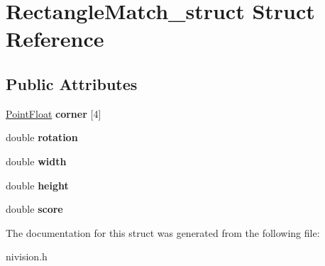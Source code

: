 \hypertarget{structRectangleMatch__struct}{
\section{RectangleMatch\_\-struct Struct Reference}
\label{structRectangleMatch__struct}
}
\subsection*{Public Attributes}
\begin{DoxyCompactItemize}
\item 
\hypertarget{structRectangleMatch__struct_a2660d504e9b45c3d09eda7be91780fc0}{
\hyperlink{structPointFloat__struct}{PointFloat} {\bfseries corner} \mbox{[}4\mbox{]}}
\label{structRectangleMatch__struct_a2660d504e9b45c3d09eda7be91780fc0}

\item 
\hypertarget{structRectangleMatch__struct_a5ef0ebf81b02ef1526378fac30749991}{
double {\bfseries rotation}}
\label{structRectangleMatch__struct_a5ef0ebf81b02ef1526378fac30749991}

\item 
\hypertarget{structRectangleMatch__struct_a35ee8f90cb6865c288dc3da085033b64}{
double {\bfseries width}}
\label{structRectangleMatch__struct_a35ee8f90cb6865c288dc3da085033b64}

\item 
\hypertarget{structRectangleMatch__struct_ae298715668834a5e4ab263f388b2b092}{
double {\bfseries height}}
\label{structRectangleMatch__struct_ae298715668834a5e4ab263f388b2b092}

\item 
\hypertarget{structRectangleMatch__struct_adecbd636149bc69329d413b0ff5a0cb4}{
double {\bfseries score}}
\label{structRectangleMatch__struct_adecbd636149bc69329d413b0ff5a0cb4}

\end{DoxyCompactItemize}


The documentation for this struct was generated from the following file:\begin{DoxyCompactItemize}
\item 
nivision.h\end{DoxyCompactItemize}
